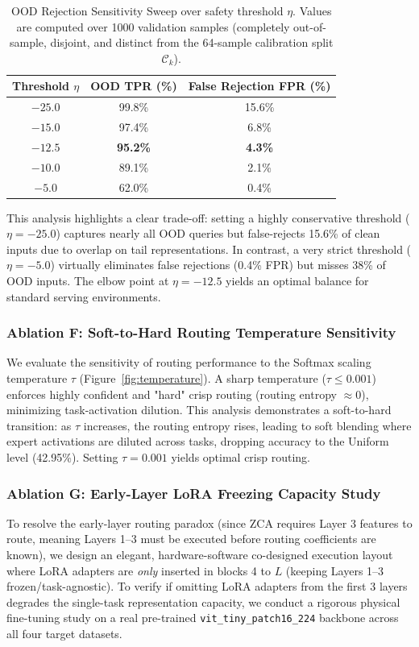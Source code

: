 \begin{table}[h]
\centering
\caption{OOD Rejection Sensitivity Sweep over safety threshold $\eta$. Values are computed over 1000 validation samples (completely out-of-sample, disjoint, and distinct from the 64-sample calibration split $\mathcal{C}_k$).}
\label{tab:ood_sensitivity}
\vskip 0.15in
\setlength{\tabcolsep}{3pt}
\small
\begin{tabular}{ccc}
\toprule
\textbf{Threshold $\eta$} & \textbf{OOD TPR (\%)} & \textbf{False Rejection FPR (\%)} \\
\midrule
$-25.0$ & 99.8\% & 15.6\% \\
$-15.0$ & 97.4\% & 6.8\% \\
$-12.5$ & \textbf{95.2\%} & \textbf{4.3\%} \\
$-10.0$ & 89.1\% & 2.1\% \\
$-5.0$  & 62.0\% & 0.4\% \\
\bottomrule
\end{tabular}
\end{table}

This analysis highlights a clear trade-off: setting a highly conservative threshold ($\eta = -25.0$) captures nearly all OOD queries but false-rejects 15.6\% of clean inputs due to overlap on tail representations.
In contrast, a very strict threshold ($\eta = -5.0$) virtually eliminates false rejections (0.4\% FPR) but misses 38\% of OOD inputs.
The elbow point at $\eta = -12.5$ yields an optimal balance for standard serving environments.



\subsubsection{Ablation F: Soft-to-Hard Routing Temperature Sensitivity}
We evaluate the sensitivity of routing performance to the Softmax scaling temperature $\tau$ (Figure~\ref{fig:temperature}).
A sharp temperature ($\tau \le 0.001$) enforces highly confident and "hard" crisp routing (routing entropy $\approx 0$), minimizing task-activation dilution.
This analysis demonstrates a soft-to-hard transition: as $\tau$ increases, the routing entropy rises, leading to soft blending where expert activations are diluted across tasks, dropping accuracy to the Uniform level (42.95\%).
Setting $\tau = 0.001$ yields optimal crisp routing.


\subsubsection{Ablation G: Early-Layer LoRA Freezing Capacity Study}
To resolve the early-layer routing paradox (since ZCA requires Layer 3 features to route, meaning Layers 1--3 must be executed before routing coefficients are known), we design an elegant, hardware-software co-designed execution layout where LoRA adapters are \emph{only} inserted in blocks 4 to $L$ (keeping Layers 1--3 frozen/task-agnostic).
To verify if omitting LoRA adapters from the first 3 layers degrades the single-task representation capacity, we conduct a rigorous physical fine-tuning study on a real pre-trained \texttt{vit\_tiny\_patch16\_224} backbone across all four target datasets.


